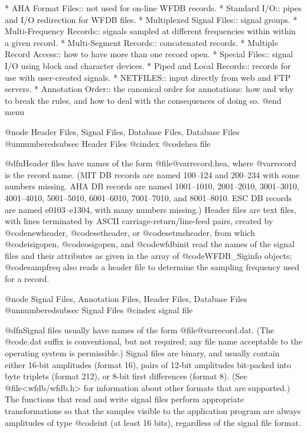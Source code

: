 {{{{{{{{{{* AHA Format Files::		not used for on-line WFDB records.
* Standard I/O::		pipes and I/O redirection for WFDB files.
* Multiplexed Signal Files::	signal groups.
* Multi-Frequency Records::     signals sampled at different frequencies within
                                 within a given record.
* Multi-Segment Records::       concatenated records.
* Multiple Record Access::	how to have more than one record open.
* Special Files::		signal I/O using block and character devices.
* Piped and Local Records::	records for use with user-created signals.
* NETFILES::			input directly from web and FTP servers.
* Annotation Order::            the canonical order for annotations:
                                 how and why to break the rules, and how
                                 to deal with the consequences of doing so.
@end menu

@node     Header Files, Signal Files, Database Files, Database Files
@unnumberedsubsec Header Files
@cindex @code{hea} file

@dfn{Header files} have names of the form @file{@var{record}.hea}, where
@var{record} is the record name.  (MIT DB records are named 100--124 and
200--234 with some numbers missing.  AHA DB records are named
1001--1010, 2001--2010, 3001--3010, 4001--4010, 5001--5010, 6001--6010,
7001--7010, and 8001--8010.  ESC DB records are named e0103--e1304, with
many numbers missing.)  Header files are text files, with lines
terminated by ASCII carriage-return/line-feed pairs, created by
@code{newheader}, @code{setheader}, or @code{setmsheader}, from which
@code{isigopen}, @code{osigopen}, and @code{wfdbinit} read the names of
the signal files and their attributes as given in the array of
@code{WFDB_Siginfo} objects; @code{sampfreq} also reads a header
file to determine the sampling frequency used for a record.

@node     Signal Files, Annotation Files, Header Files, Database Files
@unnumberedsubsec Signal Files
@cindex signal file

@dfn{Signal files} usually have names of the form
@file{@var{record}.dat}.  (The @code{.dat} suffix is conventional, but
not required; any file name acceptable to the operating system is
permissible.)  Signal files are binary, and usually contain either
16-bit amplitudes (format 16), pairs of 12-bit amplitudes bit-packed
into byte triplets (format 212), or 8-bit first differences (format 8).
(See @file{<wfdb/wfdb.h>} for information about other formats that are
supported.)  The functions that read and write signal files perform
appropriate transformations so that the samples visible to the
application program are always amplitudes of type @code{int} (at least
16 bits), regardless of the signal file format.

}}}}}}}}}}
